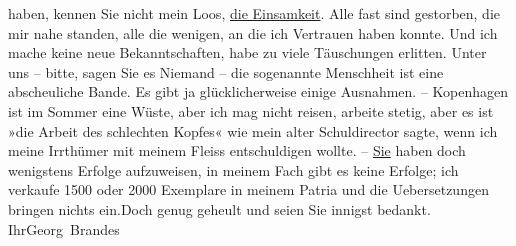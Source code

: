 \begin{ledgroupsized}[t]{13cm}
               haben, kennen Sie nicht mein Loos, \uline{die Einsamkeit}.
               Alle fast sind gestorben, die mir nahe standen, alle {\pb}die wenigen, an die ich Vertrauen
               haben konnte. Und ich mache keine neue Bekanntschaften, habe zu viele Täuschungen
               erlitten. Unter uns – bitte, sagen Sie es Niemand – die sogenannte Menschheit ist
               eine abscheuliche Bande. Es gibt ja glücklicherweise einige Ausnahmen. – Kopenhagen ist im Sommer eine Wüste, aber ich
               mag nicht reisen, arbeite stetig, aber es ist »die Arbeit des schlechten Kopfes« wie
               mein alter Schuldirector
               sagte, wenn ich meine Irrthümer mit meinem Fleiss entschuldigen wollte. – \uline{Sie} haben doch wenigstens Erfolge aufzuweisen, in
               meinem Fach gibt es keine Erfolge; ich verkaufe 1500 oder 2000 Exemplare in meinem
               Patria und die Uebersetzungen bringen nichts ein.\hspace*{2em}Doch genug geheult und seien Sie innigst bedankt. Ihr\spacefill\mbox{Georg Brandes}\pend
           
         
         \endnumbering{}\end{ledgroupsized}  \newcommand{\dateiname}{L02445}\newcommand{\titel}{Georg Brandes an Arthur Schnitzler, 12. 7. 1925}\newcommand{\editorInnen}{Martin Anton Müller und Gerd-Hermann Susen}
      